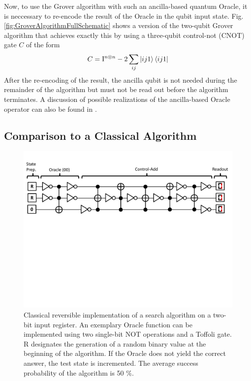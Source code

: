 \smallskip

Now, to use the Grover algorithm with such an ancilla-based quantum Oracle, it is neccessary to re-encode the result of the Oracle in the qubit input state. Fig. \ref{fig:GroverAlgorithmFullSchematic} shows a version of the two-qubit Grover algorithm that achieves exactly this by using a three-qubit control-not (CNOT) gate $C$ of the form
%
\begin{equation}
C = \mathrm{I}^{n\otimes n}-2\sum\limits_{ij} \left| ij1 \right>\left< ij1 \right|
\end{equation}
%
After the re-encoding of the result, the ancilla qubit is not needed during the remainder of the algorithm but must not be read out before the algorithm terminates. A discussion of possible realizations of the ancilla-based Oracle operator can also be found in \citep{mermin_quantum_2007}.

\subsection{Comparison to a Classical Algorithm}

\begin{figure}[ht!]
	\centering
		\includegraphics[width=1.0\textwidth]{"./material/papers/grover/classical_reversible_algorithm"}
	\caption{Classical reversible implementation of a search algorithm on a two-bit input register. An exemplary Oracle function can be implemented using two single-bit NOT operations and a Toffoli gate. R designates the generation of a random binary value at the beginning of the algorithm. If the Oracle does not yield the correct answer, the test state is incremented. The average success probability of the algorithm is 50 \%.}
	\label{fig:GroverClassicalReversibleAlgorithm}
\end{figure}

